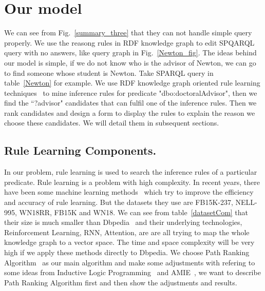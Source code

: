 \documentclass[runningheads]{llncs}
\begin{document}
\section{Our model}
We can see from Fig.~\ref{summary_three} that they can not handle simple query properly. We use the reasong rules in RDF knowledge graph to edit SPQARQL query with no answers, like query graph in Fig.~\ref{Newton_fig}. The ideas behind our model is simple, if we do not know who is the advisor of Newton, we can go to find someone whose student is Newton. Take SPARQL query in table~\ref{Newton} for example. We use RDF knowledge graph oriented rule learning techniques~\cite{lao2011random} to mine inference rules for predicate "dbo:doctoralAdvisor",  then we find the ``?advisor" candidates that can fulfil one of the inference rules. Then we rank candidates and design a form to display the rules to explain the reason we choose these candidates. We will detail them in subsequent sections.
\subsection{Rule Learning Components.}
In our problem, rule learning is used to search the inference rules of a particular predicate. Rule learning is a problem with high complexity. In recent years, there have been some machine learning methods~\cite{lao2011random,xiong2017deeppath,yang2017differentiable,das2017go,das2016chains} which try to improve the efficiency and accuracy of rule learning. But the datasets they use are FB15K-237, NELL-995, WN18RR, FB15K and WN18. We can see from table~\ref{datasetCom} that their size is much smaller than Dbpedia~\cite{dbpedi} and their underlying technologies, Reinforcement Learning, RNN, Attention, are are all trying to map the whole knowledge graph to a vector space. The time and space complexity will be very high if we apply these methods directly to Dbpedia.
We choose Path Ranking Algorithm~\cite{lao2011random} as our main algorithm and make some adjustments with refering to some ideas from Inductive Logic Programming~\cite{camacho2004inductive} and AMIE~\cite{galarraga2013amie}, we want to describe Path Ranking Algorithm first and then show the adjustments and results.
\end{document}

